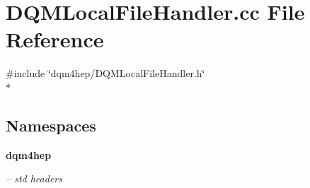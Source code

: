 \section{D\+Q\+M\+Local\+File\+Handler.\+cc File Reference}
\label{DQMLocalFileHandler_8cc}
{\ttfamily \#include \char`\"{}dqm4hep/\+D\+Q\+M\+Local\+File\+Handler.\+h\char`\"{}}\\*
\subsection*{Namespaces}
\begin{DoxyCompactItemize}
\item 
 {\bf dqm4hep}
\begin{DoxyCompactList}\small\item\em -- std headers \end{DoxyCompactList}\end{DoxyCompactItemize}
